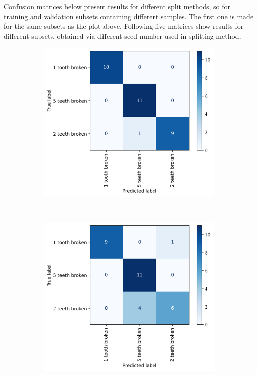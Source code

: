 \documentclass[energies,article,submit,pdftex,moreauthors]{Definitions/mdpi}
\begin{document}
Confusion matrices below present results for different split methods, so for training and validation subsets containing different samples. The first one is made for the same subsets as the plot above. Following five matrices show results for different subsets, obtained via different seed number used in splitting method.


\begin{figure}[t!]
    \centering
    \begin{subfigure}[t]{0.3\textwidth}
        \centering
        \includegraphics[width=\linewidth]{images/confusion_matrix_multiclass}
        \caption{}
    \end{subfigure}%
    ~ 
    \begin{subfigure}[t]{0.3\textwidth}
        \centering
        \includegraphics[width=\linewidth]{images/confusion_matrix_multiclass_1}

\end{subfigure}
\end{figure}
\end{document}
